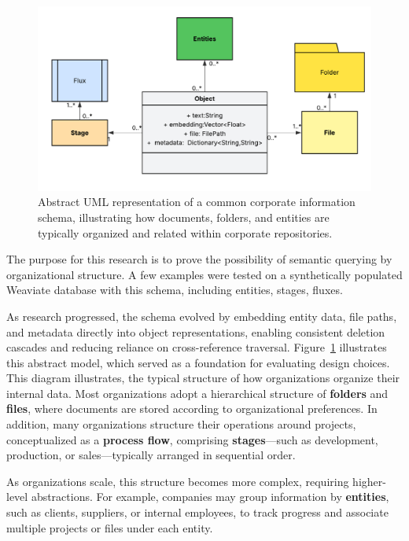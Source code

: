 \begin{figure}[h!]
    \centering
    \includegraphics[width=1\linewidth]{Images/Classe UML.png}
    \caption{Abstract UML representation of a common corporate information schema, illustrating how documents, folders, and entities are typically organized and related within corporate repositories.}\label{fig:weaviate_class}
\end{figure}

The purpose for this research is to prove the possibility of semantic querying by organizational structure. A few examples were tested on a synthetically populated Weaviate database with this schema, including entities, stages, fluxes.

As research progressed, the schema evolved by embedding entity data, file paths, and metadata directly into object representations, enabling consistent deletion cascades and reducing reliance on cross-reference traversal. Figure~\ref{fig:weaviate_class} illustrates this abstract model, which served as a foundation for evaluating design choices. 
This diagram illustrates, the typical structure of how organizations organize their internal data. Most organizations adopt a hierarchical structure of \textbf{folders} and \textbf{files}, where documents are stored according to organizational preferences. In addition, many organizations structure their operations around projects, conceptualized as a \textbf{process flow}, comprising \textbf{stages}—such as development, production, or sales—typically arranged in sequential order.

As organizations scale, this structure becomes more complex, requiring higher-level abstractions. For example, companies may group information by \textbf{entities}, such as clients, suppliers, or internal employees, to track progress and associate multiple projects or files under each entity.

